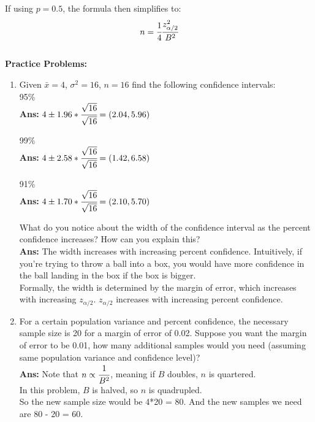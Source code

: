 \documentclass[12pt]{article}
\begin{document}
If using $p=0.5$, the formula then simplifies to:\\
$$n=\cfrac{1}{4}\cfrac{z_{\alpha/2}^{2}}{B^{2}}$$\\
\noindent \textbf{Practice Problems:}\\
\begin{enumerate}
\item Given $\bar{x}=4$, $\sigma^{2}= 16$, $n=16$ find the following confidence intervals:\\
95\%\\
\textbf{Ans:} $4 \pm 1.96*\cfrac{\sqrt{16}}{\sqrt{16}}=(2.04,5.96)$
\bigbreak

99\%\\
\textbf{Ans:} $4 \pm 2.58*\cfrac{\sqrt{16}}{\sqrt{16}}=(1.42,6.58)$

\bigbreak

91\%\\
\textbf{Ans:} $4 \pm 1.70*\cfrac{\sqrt{16}}{\sqrt{16}}=(2.10,5.70)$
\bigbreak

What do you notice about the width of the confidence interval as the percent confidence increases? How can you explain this?\\
\textbf{Ans:} The width increases with increasing percent confidence. Intuitively, if you're trying to throw a ball into a box, you would have more confidence in the ball landing in the box if the box is bigger. \\
Formally, the width is determined by the margin of error, which increases with increasing $z_{\alpha/2}$. $z_{\alpha/2}$ increases with increasing percent confidence.
\bigbreak
\item For a certain population variance and percent confidence, the necessary sample size is 20 for a margin of error of 0.02. Suppose you want the margin of error to be 0.01, how many additional samples would you need (assuming same population variance and confidence level)?\\
\textbf{Ans:} Note that $n \propto \cfrac{1}{B^{2}}$, meaning if $B$ doubles, $n$ is quartered. \\
In this problem, $B$ is halved, so $n$ is quadrupled. \\
So the new sample size would be 4*20 = 80. And the new samples we need are 80 - 20 = 60. 



\end{enumerate}
\end{document}

